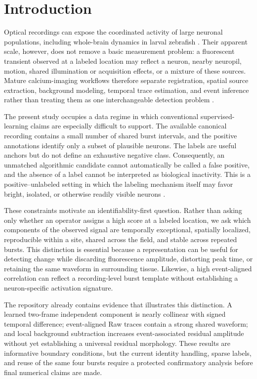 \section{Introduction}
\label{sec:introduction}

Optical recordings can expose the coordinated activity of large neuronal populations, including whole-brain dynamics in larval zebrafish \citep{ahrens2013wholebrain}. Their apparent scale, however, does not remove a basic measurement problem: a fluorescent transient observed at a labeled location may reflect a neuron, nearby neuropil, motion, shared illumination or acquisition effects, or a mixture of these sources. Mature calcium-imaging workflows therefore separate registration, spatial source extraction, background modeling, temporal trace estimation, and event inference rather than treating them as one interchangeable detection problem \citep{pnevmatikakis2016simultaneous,giovannucci2019caiman,zhou2018cnmfe,keemink2018fissa,friedrich2017oasis}.

The present study occupies a data regime in which conventional supervised-learning claims are especially difficult to support. The available canonical recording contains a small number of shared burst intervals, and the positive annotations identify only a subset of plausible neurons. The labels are useful anchors but do not define an exhaustive negative class. Consequently, an unmatched algorithmic candidate cannot automatically be called a false positive, and the absence of a label cannot be interpreted as biological inactivity. This is a positive--unlabeled setting in which the labeling mechanism itself may favor bright, isolated, or otherwise readily visible neurons \citep{bekker2020pu}.

These constraints motivate an identifiability-first question. Rather than asking only whether an operator assigns a high score at a labeled location, we ask which components of the observed signal are temporally exceptional, spatially localized, reproducible within a site, shared across the field, and stable across repeated bursts. This distinction is essential because a representation can be useful for detecting change while discarding fluorescence amplitude, distorting peak time, or retaining the same waveform in surrounding tissue. Likewise, a high event-aligned correlation can reflect a recording-level burst template without establishing a neuron-specific activation signature.

The repository already contains evidence that illustrates this distinction. A learned two-frame independent component is nearly collinear with signed temporal difference; event-aligned Raw traces contain a strong shared waveform; and local background subtraction increases event-associated residual amplitude without yet establishing a universal residual morphology. These results are informative boundary conditions, but the current identity handling, sparse labels, and reuse of the same four bursts require a protected confirmatory analysis before final numerical claims are made.

